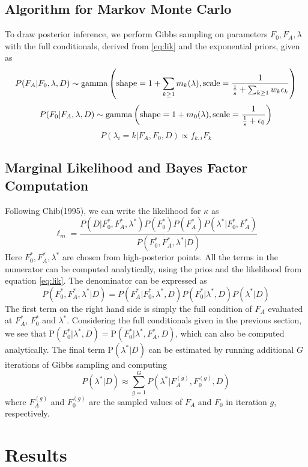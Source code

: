\documentclass[dvips,aoas]{imsart}
\newcommand{\be}{\begin{equation}}
\newcommand{\ee}{\end{equation}}
\begin{document}
\subsection{Algorithm for Markov Monte Carlo}

To draw posterior inference, we perform Gibbs sampling on parameters $F_0,F_A,\lambda$ with the full conditionals,
derived from  \ref{eq:lik} and the exponential priors, given as
\be
P(F_A|F_0,\lambda,D) \sim \mbox{gamma}\left(\mbox{shape}= 1+\sum_{k\geq 1}m_k(\lambda),\mbox{scale}={1\over{{1\over s} + \sum_{k\geq 1}w_k\epsilon_k}}\right)
\ee
\be
P(F_0|F_A,\lambda,D) \sim \mbox{gamma}\left(\mbox{shape}=1+m_0(\lambda), \mbox{scale}={1\over {1\over s}+\epsilon_0}\right)
\ee
\be
P(\lambda_i=k|F_A,F_0,D) \propto f_{k,i}F_k
\ee


\subsection{Marginal Likelihood and Bayes Factor Computation}
Following Chib(1995), we can write the likelihood for $\kappa$ as
\be
\ell_m = \frac{P\left(D|F_0^*,F_A^*,\lambda^*\right)P\left(F_0^*\right)P\left(F_A^*\right)P\left(\lambda^*|F_0^*,F_A^*\right)}{P\left(F_0^*,F_A^*,\lambda^*|D\right)}
\ee
Here  $F_0^*, F_A^*, \lambda^*$ are chosen from high-posterior points. All the terms in the
 numerator can be computed analytically, using the prios and the likelihood from equation \ref{eq:lik}.
The denominator can be expressed as
\be
P\left(F_0^*,F_A^*,\lambda^*|D\right)=P(F_A^*|F_0^*,\lambda^*,D)P(F_0^*|\lambda^*,D)P(\lambda^*|D)
\ee
The first term on the right hand side is simply the full condition of $F_A$ evaluated at $F_A^*$, $F_0^*$
and $\lambda^*$. Considering the full conditionals given in the previous section, we see that
$\mbox{P}(F_0^*|\lambda^*,D) = \mbox{P}(F_0^*|\lambda^*,F_A^*,D)$, which can also be
computed analytically. The final term $\mbox{P}(\lambda^*|D)$ can be estimated by running additional
$G$ iterations of Gibbs sampling and computing
\be
P(\lambda^*|D) \approx \sum_{g=1}^G P(\lambda^*|F_A^{(g)},F_0^{(g)},D)
\ee
where $F_A^{(g)}$ and $F_0^{(g)}$ are the sampled values of $F_A$ and $F_0$ in iteration $g$, respectively.

\section{Results}
\end{document}
